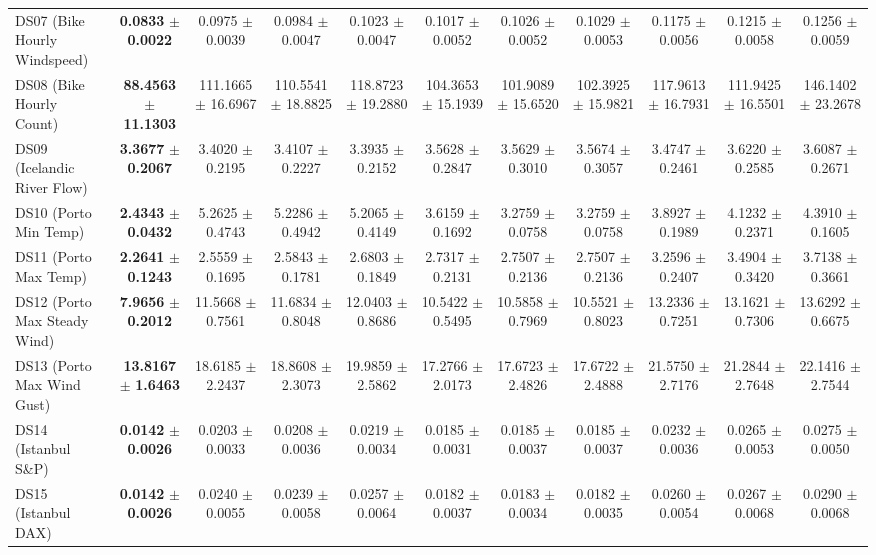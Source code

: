 \begin{table}[t]
{{\begin{tabular}{lcccccccccc}
DS07 (Bike Hourly Windspeed) & \textbf{0.0833} $\pm$ \textbf{0.0022} & 0.0975 $\pm$ 0.0039 & 0.0984 $\pm$ 0.0047 & 0.1023 $\pm$ 0.0047 & 0.1017 $\pm$ 0.0052 & 0.1026 $\pm$ 0.0052 & 0.1029 $\pm$ 0.0053 & 0.1175 $\pm$ 0.0056 & 0.1215 $\pm$ 0.0058 & 0.1256 $\pm$ 0.0059 \\
DS08 (Bike Hourly Count) & \textbf{88.4563} $\pm$ \textbf{11.1303} & 111.1665 $\pm$ 16.6967 & 110.5541 $\pm$ 18.8825 & 118.8723 $\pm$ 19.2880 & 104.3653 $\pm$ 15.1939 & 101.9089 $\pm$ 15.6520 & 102.3925 $\pm$ 15.9821 & 117.9613 $\pm$ 16.7931 & 111.9425 $\pm$ 16.5501 & 146.1402 $\pm$ 23.2678 \\
DS09 (Icelandic River Flow) & \textbf{3.3677} $\pm$ \textbf{0.2067} & 3.4020 $\pm$ 0.2195 & 3.4107 $\pm$ 0.2227 & 3.3935 $\pm$ 0.2152 & 3.5628 $\pm$ 0.2847 & 3.5629 $\pm$ 0.3010 & 3.5674 $\pm$ 0.3057 & 3.4747 $\pm$ 0.2461 & 3.6220 $\pm$ 0.2585 & 3.6087 $\pm$ 0.2671 \\
DS10 (Porto Min Temp) & \textbf{2.4343} $\pm$ \textbf{0.0432} & 5.2625 $\pm$ 0.4743 & 5.2286 $\pm$ 0.4942 & 5.2065 $\pm$ 0.4149 & 3.6159 $\pm$ 0.1692 & 3.2759 $\pm$ 0.0758 & 3.2759 $\pm$ 0.0758 & 3.8927 $\pm$ 0.1989 & 4.1232 $\pm$ 0.2371 & 4.3910 $\pm$ 0.1605 \\
DS11 (Porto Max Temp) & \textbf{2.2641} $\pm$ \textbf{0.1243} & 2.5559 $\pm$ 0.1695 & 2.5843 $\pm$ 0.1781 & 2.6803 $\pm$ 0.1849 & 2.7317 $\pm$ 0.2131 & 2.7507 $\pm$ 0.2136 & 2.7507 $\pm$ 0.2136 & 3.2596 $\pm$ 0.2407 & 3.4904 $\pm$ 0.3420 & 3.7138 $\pm$ 0.3661 \\
DS12 (Porto Max Steady Wind) & \textbf{7.9656} $\pm$ \textbf{0.2012} & 11.5668 $\pm$ 0.7561 & 11.6834 $\pm$ 0.8048 & 12.0403 $\pm$ 0.8686 & 10.5422 $\pm$ 0.5495 & 10.5858 $\pm$ 0.7969 & 10.5521 $\pm$ 0.8023 & 13.2336 $\pm$ 0.7251 & 13.1621 $\pm$ 0.7306 & 13.6292 $\pm$ 0.6675 \\
DS13 (Porto Max Wind Gust) & \textbf{13.8167} $\pm$ \textbf{1.6463} & 18.6185 $\pm$ 2.2437 & 18.8608 $\pm$ 2.3073 & 19.9859 $\pm$ 2.5862 & 17.2766 $\pm$ 2.0173 & 17.6723 $\pm$ 2.4826 & 17.6722 $\pm$ 2.4888 & 21.5750 $\pm$ 2.7176 & 21.2844 $\pm$ 2.7648 & 22.1416 $\pm$ 2.7544 \\
DS14 (Istanbul S\&P) & \textbf{0.0142} $\pm$ \textbf{0.0026} & 0.0203 $\pm$ 0.0033 & 0.0208 $\pm$ 0.0036 & 0.0219 $\pm$ 0.0034 & 0.0185 $\pm$ 0.0031 & 0.0185 $\pm$ 0.0037 & 0.0185 $\pm$ 0.0037 & 0.0232 $\pm$ 0.0036 & 0.0265 $\pm$ 0.0053 & 0.0275 $\pm$ 0.0050 \\
DS15 (Istanbul DAX) & \textbf{0.0142} $\pm$ \textbf{0.0026} & 0.0240 $\pm$ 0.0055 & 0.0239 $\pm$ 0.0058 & 0.0257 $\pm$ 0.0064 & 0.0182 $\pm$ 0.0037 & 0.0183 $\pm$ 0.0034 & 0.0182 $\pm$ 0.0035 & 0.0260 $\pm$ 0.0054 & 0.0267 $\pm$ 0.0068 & 0.0290 $\pm$ 0.0068 \\

\end{tabular}}}
\end{table}
